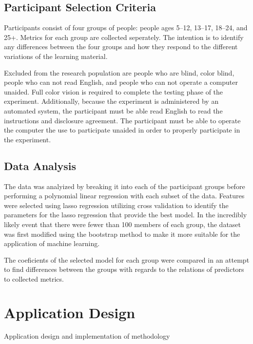 \documentclass[12pt]{report}
\begin{document}
\section{Participant Selection Criteria}

Participants consist of four groups of people: people ages 5--12, 13--17, 18--24, and 25+. Metrics for each group are collected seperately. The intention is to identify any differences between the four groups and how they respond to the different variations of the learning material.

Excluded from the research population are people who are blind, color blind, people who can not read English, and people who can not operate a computer unaided. Full color vision is required to complete the testing phase of the experiment. Additionally, because the experiment is administered by an automated system, the participant must be able read English to read the instructions and disclosure agreement. The participant must be able to operate the computer the use to participate unaided in order to properly participate in the experiment.

\section{Data Analysis}

The data was analyized by breaking it into each of the participant groups before performing a polynomial linear regression with each subset of the data. Features were selected using lasso regression utilizing cross validation to identify the parameters for the lasso regression that provide the best model. In the incredibly likely event that there were fewer than 100 members of each group, the dataset was first modified using the bootstrap method to make it more suitable for the application of machine learning.

The coeficients of the selected model for each group were compared in an attempt to find differences between the groups with regards to the relations of predictors to collected metrics.

\chapter{Application Design}
\label{ch:Overall Design}

Application design and implementation of methodology
\end{document}
